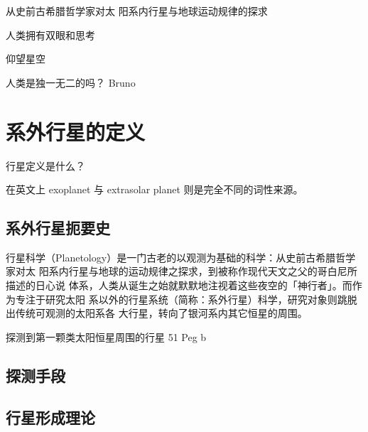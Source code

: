 从史前古希腊哲学家对太
阳系内行星与地球运动规律的探求

人类拥有双眼和思考

仰望星空

人类是独一无二的吗？ Bruno


\section{系外行星的定义}

行星定义是什么？

在英文上 exoplanet 与 extrasolar planet 则是完全不同的词性来源。


\subsection{系外行星扼要史}

行星科学（Planetology）是一门古老的以观测为基础的科学：从史前古希腊哲学家对太
阳系内行星与地球的运动规律之探求，到被称作现代天文之父的哥白尼所描述的日心说
体系，人类从诞生之始就默默地注视着这些夜空的「神行者」。而作为专注于研究太阳
系以外的行星系统（简称：系外行星）科学，研究对象则跳脱出传统可观测的太阳系各
大行星，转向了银河系内其它恒星的周围。

探测到第一颗类太阳恒星周围的行星 51 Peg b 

\subsection{探测手段}

\subsection{行星形成理论}



